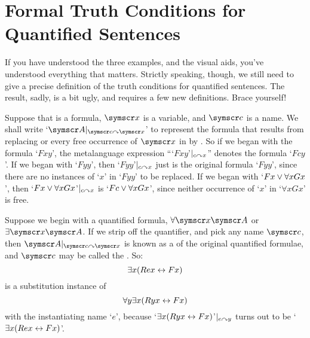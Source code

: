 \section{Formal Truth Conditions for Quantified Sentences}\label{fol.truth.quant}

If you have understood the three examples, and the visual aids, you've understood everything that matters. Strictly speaking, though, we still need to give a precise definition of the truth conditions for quantified sentences. The result, sadly, is a bit ugly, and requires a few new definitions. Brace yourself!

Suppose that  is a formula, $\meta{x}$ is a variable, and $\meta{c}$ is a name. We shall write `$\meta{A}\subs{\meta{c}}{\meta{x}}$' to represent the formula that results from replacing or  every free occurrence of $\meta{x}$ in  by . So if we began with the formula `$Fxy$', the metalanguage expression ``{`$Fxy$'}$\vert_{c\curvearrowright x}$'' denotes the formula `$Fcy$'. If we began with `$Fyy$', then `$Fyy$'$\vert_{c\curvearrowright x}$ just is the original formula `$Fyy$', since there are no instances of `$x$' in `$Fyy$' to be replaced. If we began with `$Fx \vee \forall x Gx$', then `$Fx \vee \forall x Gx$'$\vert_{c\curvearrowright x}$ is `$Fc \vee \forall x Gx$', since neither occurrence of `$x$' in `$\forall x Gx$' is free.

Suppose we begin with a quantified formula, $\forall \meta{x}\meta{A}$ or $\exists \meta{x}\meta{A}$. If we strip off the quantifier, and pick any name $\meta{c}$, then $\meta{A}\subs{\meta{c}}{\meta{x}}$ is known as a   of the original quantified formulae, and $\meta{c}$ may be called the . So:
	$$\exists x (Rex \leftrightarrow Fx)$$
is a substitution instance of 
	$$\forall y \exists x (Ryx \leftrightarrow Fx)$$
with the instantiating name `$e$', because  `$\exists x (Ryx \leftrightarrow Fx)$'$\vert_{e\curvearrowright y}$ turns out to be `$\exists x (Rex \leftrightarrow Fx)$'.

